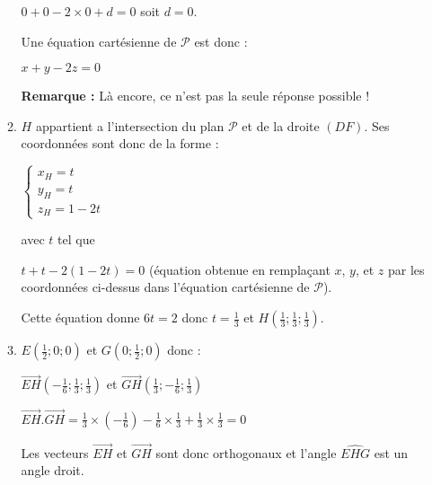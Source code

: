 \begin{corrige}
\begin{enumerate}
\begin{enumerate}[label=\alph*.]
                         \par
                         $0+0-2\times 0+d=0$ soit $d=0$.
                         \par
                         Une équation cartésienne de $\mathscr P$ est donc :
                         \par
                         $x+y-2z=0$
\par
                         \textbf{Remarque : }
                         Là encore, ce n'est pas la seule réponse possible !
                         \item
                         $H$ appartient a l'intersection du plan $\mathscr P$ et de la droite $\left(DF\right)$. Ses coordonnées sont donc de la forme :
                         \par
                         $\left\{ \begin{matrix} x_{H}=t  \\ y_{H}=t  \\ z_{H}=1-2t \end{matrix}\right.$
                              \par
                              avec $t$ tel que
                              \par
                              $t+t-2\left(1-2t\right)=0$ (équation obtenue en remplaçant $x$, $y$, et $z$ par les coordonnées ci-dessus dans l'équation cartésienne de $\mathscr P$).
                              \par
                              Cette équation donne $6t=2$ donc $t=\frac{1}{3}$ et $H \left(\frac{1}{3};\frac{1}{3};\frac{1}{3}\right)$.
                              \item
                              $E\left(\frac{1}{2};0;0\right)$ et $G\left(0;\frac{1}{2};0\right)$ donc :
                              \par
                              $\overrightarrow{EH}\left(-\frac{1}{6};\frac{1}{3};\frac{1}{3}\right)$ et $\overrightarrow{GH}\left(\frac{1}{3};-\frac{1}{6};\frac{1}{3}\right)$
                              \par
                              $\overrightarrow{EH}.\overrightarrow{GH} =\frac{1}{3}\times \left(-\frac{1}{6}\right)-\frac{1}{6}\times \frac{1}{3}+\frac{1}{3}\times \frac{1}{3}=0$
                              \par
                              Les vecteurs $\overrightarrow{EH}$ et $\overrightarrow{GH}$ sont donc orthogonaux et l'angle $\widehat{EHG}$ est un angle droit.

\end{enumerate}
\end{enumerate}
\end{corrige}
